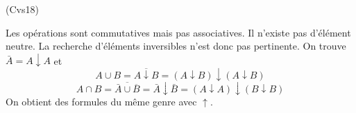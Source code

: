 \begin{tiny}(Cvs18)\end{tiny} Les opérations sont commutatives mais pas associatives. Il n'existe pas d'élément neutre. La recherche d'éléments inversibles n'est donc pas pertinente.\newline 
On trouve $\bar{A} = A \downarrow A$ et 
\begin{displaymath}
A\cup B = \overline{A\downarrow B} = (A\downarrow B)\downarrow (A\downarrow B) 
\end{displaymath}
\begin{displaymath}
A\cap B = \overline{\bar{A}\cup \overline{B}}=\bar{A}\downarrow \bar B
=(A\downarrow A)\downarrow (B\downarrow B)
\end{displaymath}
On obtient des formules du même genre avec $\uparrow$. 